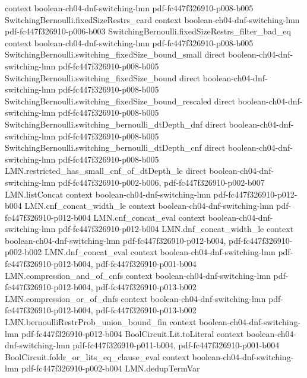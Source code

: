 \begin{theorem}
  {context}
  {boolean-ch04-dnf-switching-lmn}
  {pdf-fc447f326910-p008-b005}
\proofstep
  {SwitchingBernoulli.fixedSizeRestrs_card}
  {context}
  {boolean-ch04-dnf-switching-lmn}
  {pdf-fc447f326910-p006-b003}
\proofstep
  {SwitchingBernoulli.fixedSizeRestrs_filter_bad_eq}
  {context}
  {boolean-ch04-dnf-switching-lmn}
  {pdf-fc447f326910-p008-b005}
\proofstep
  {SwitchingBernoulli.switching_fixedSize_bound_small}
  {direct}
  {boolean-ch04-dnf-switching-lmn}
  {pdf-fc447f326910-p008-b005}
\proofstep
  {SwitchingBernoulli.switching_fixedSize_bound}
  {direct}
  {boolean-ch04-dnf-switching-lmn}
  {pdf-fc447f326910-p008-b005}
\proofstep
  {SwitchingBernoulli.switching_fixedSize_bound_rescaled}
  {direct}
  {boolean-ch04-dnf-switching-lmn}
  {pdf-fc447f326910-p008-b005}
\proofstep
  {SwitchingBernoulli.switching_bernoulli_dtDepth_dnf}
  {direct}
  {boolean-ch04-dnf-switching-lmn}
  {pdf-fc447f326910-p008-b005}
\proofstep
  {SwitchingBernoulli.switching_bernoulli_dtDepth_cnf}
  {direct}
  {boolean-ch04-dnf-switching-lmn}
  {pdf-fc447f326910-p008-b005}
\proofstep
  {LMN.restricted_has_small_cnf_of_dtDepth_le}
  {direct}
  {boolean-ch04-dnf-switching-lmn}
  {pdf-fc447f326910-p002-b006,
    pdf-fc447f326910-p002-b007}
\proofstep
  {LMN.listConcat}
  {context}
  {boolean-ch04-dnf-switching-lmn}
  {pdf-fc447f326910-p012-b004}
\proofstep
  {LMN.cnf_concat_width_le}
  {context}
  {boolean-ch04-dnf-switching-lmn}
  {pdf-fc447f326910-p012-b004}
\proofstep
  {LMN.cnf_concat_eval}
  {context}
  {boolean-ch04-dnf-switching-lmn}
  {pdf-fc447f326910-p012-b004}
\proofstep
  {LMN.dnf_concat_width_le}
  {context}
  {boolean-ch04-dnf-switching-lmn}
  {pdf-fc447f326910-p012-b004,
    pdf-fc447f326910-p002-b002}
\proofstep
  {LMN.dnf_concat_eval}
  {context}
  {boolean-ch04-dnf-switching-lmn}
  {pdf-fc447f326910-p012-b004,
    pdf-fc447f326910-p001-b004}
\proofstep
  {LMN.compression_and_of_cnfs}
  {context}
  {boolean-ch04-dnf-switching-lmn}
  {pdf-fc447f326910-p012-b004,
    pdf-fc447f326910-p013-b002}
\proofstep
  {LMN.compression_or_of_dnfs}
  {context}
  {boolean-ch04-dnf-switching-lmn}
  {pdf-fc447f326910-p012-b004,
    pdf-fc447f326910-p013-b002}
\proofstep
  {LMN.bernoulliRestrProb_union_bound_fin}
  {context}
  {boolean-ch04-dnf-switching-lmn}
  {pdf-fc447f326910-p012-b004}
\proofstep
  {BoolCircuit.Lit.toLiteral}
  {context}
  {boolean-ch04-dnf-switching-lmn}
  {pdf-fc447f326910-p011-b004,
    pdf-fc447f326910-p001-b004}
\proofstep
  {BoolCircuit.foldr_or_lits_eq_clause_eval}
  {context}
  {boolean-ch04-dnf-switching-lmn}
  {pdf-fc447f326910-p002-b004}
\proofstep
  {LMN.dedupTermVar}

\end{theorem}
